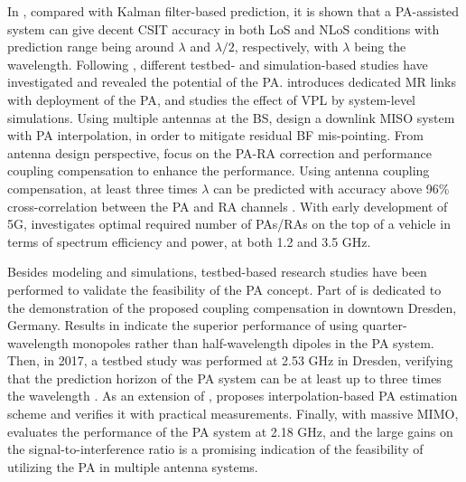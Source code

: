 \documentclass[conference]{IEEEtran}
\begin{document}
In \cite{Sternad2012WCNCWusing}, compared with Kalman filter-based prediction, it is shown that a \ac{PA}-assisted system can give decent \ac{CSIT} accuracy in both \ac{LoS} and \ac{NLoS} conditions with prediction range being around $\lambda$ and $\lambda/2$, respectively, with $\lambda$ being the wavelength. Following \cite{Sternad2012WCNCWusing}, different testbed- and simulation-based studies have investigated and revealed the potential of the \ac{PA}. \cite{yutao2013moving} introduces dedicated \ac{MR} links with deployment of the \ac{PA}, and studies the effect of \ac{VPL} by system-level simulations. Using multiple antennas at the \ac{BS}, \cite{Dinh2013ICCVEadaptive} design a downlink \ac{MISO} system with \ac{PA} interpolation, in order to mitigate residual \ac{BF} mis-pointing. From antenna design perspective, \cite{Jamaly2014EuCAPanalysis} focus on the \ac{PA}-\ac{RA} correction and performance coupling compensation to enhance the performance. Using antenna coupling compensation, at least three times $\lambda$ can be predicted with accuracy above 96\% cross-correlation between the \ac{PA} and \ac{RA} channels \cite{Jamaly2014EuCAPanalysis}. With early development of 5G, \cite{PhanHuy2016GLOBECOM5g} investigates optimal required number of \acp{PA}/\acp{RA} on the top of a vehicle in terms of spectrum efficiency and power, at both 1.2 and 3.5 GHz. 

Besides modeling and simulations, testbed-based research studies have been performed to validate the feasibility of the \ac{PA} concept. Part of \cite{Jamaly2014EuCAPanalysis} is dedicated to the demonstration of the proposed coupling compensation in downtown Dresden, Germany. Results in \cite{Jamaly2014EuCAPanalysis}  indicate the superior performance of using quarter-wavelength monopoles rather than half-wavelength dipoles in the \ac{PA} system. Then, in 2017, a testbed study was performed at 2.53 GHz in Dresden, verifying that the prediction horizon of the \ac{PA} system can be at least up to three times the wavelength \cite{BJ2017ICCWusing}. As an extension of \cite{BJ2017ICCWusing}, \cite{BJ2017PIMRCpredictor} proposes interpolation-based \ac{PA} estimation scheme and verifies it with practical measurements. Finally, with massive \ac{MIMO}, \cite{phan2018WSAadaptive} evaluates the performance of the \ac{PA} system at 2.18 GHz, and the large gains on the  signal-to-interference ratio is a promising indication of the feasibility of utilizing the  \ac{PA} in multiple antenna systems.
\end{document}
